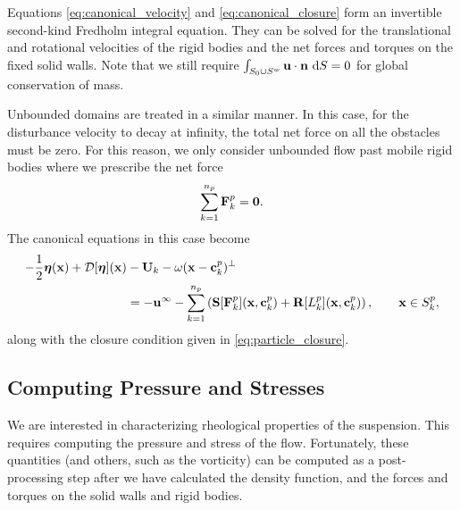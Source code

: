 Equations \eqref{eq:canonical_velocity} and \eqref{eq:canonical_closure} form an invertible second-kind Fredholm integral equation. They can be solved for the translational and rotational velocities of the rigid bodies and the  net forces and torques on the fixed solid walls. Note that we still require $\int_{S_0\cup S^w} {\mathbf{u}}\cdot{\mathbf{n}}~\text{d}S = 0$ for global conservation of mass.

Unbounded domains are  treated in a similar manner. In this case, for the disturbance velocity to decay at infinity, the total net force on all the obstacles must be zero. For this reason, we only consider unbounded flow past mobile rigid bodies where we prescribe the net force
\[ \sum\limits_{k=1}^{n_p} {\mathbf{F}}^p_k = \mathbf{0}.\]
 The canonical equations in this case become
 \begin{equation}\label{eq:canonical_unbounded}
\begin{aligned}
	-\frac{1}{2}\bm{\eta}({\mathbf{x}}) + \mathcal{D}[\bm{\eta}]({\mathbf{x}}) &- {\mathbf{U}}_k - \omega({\mathbf{x}} - {\mathbf{c}}^p_k)^\perp \\&= -{\mathbf{u}}^{\infty} -  \sum\limits_{k=1}^{n_p} \left({\mathbf{S}}[{\mathbf{F}}^p_k]({\mathbf{x}},{\mathbf{c}}^p_k) + {\mathbf{R}}[L^p_k]({\mathbf{x}},{\mathbf{c}}^p_k)\right),\qquad {\mathbf{x}}\in S^p_k,\end{aligned}
\end{equation}
along with the closure condition given in \eqref{eq:particle_closure}. 

\subsection{Computing Pressure and Stresses}

We are interested in characterizing rheological properties of the suspension. This requires computing the pressure and stress of the flow. Fortunately, these quantities (and others, such as the vorticity) can be computed as a post-processing step after we have calculated the density function, and the forces and torques on the solid walls and rigid bodies. 

